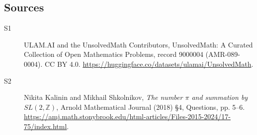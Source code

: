 \documentclass[11pt]{article}
\begin{document}
\subsection{Sources}
\begin{description}
\item[\hypertarget{source:9000004:1}{S1}] ULAM.AI and the UnsolvedMath Contributors, UnsolvedMath: A Curated Collection of Open Mathematics Problems, record 9000004 (AMR-089-0004). CC BY 4.0. \url{https://huggingface.co/datasets/ulamai/UnsolvedMath}.
\item[\hypertarget{source:9000004:2}{S2}] Nikita Kalinin and Mikhail Shkolnikov, \emph{The number $\pi$ and summation by $SL(2,\mathbb Z)$}, Arnold Mathematical Journal (2018) \S4, Questions, pp. 5--6. \url{https://amj.math.stonybrook.edu/html-articles/Files-2015-2024/17-75/index.html}.
\end{description}
\label{end:9000004}
\end{document}
